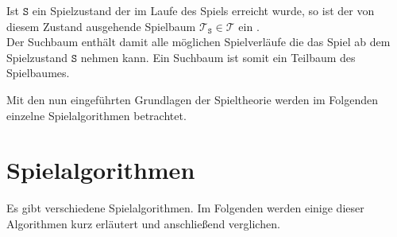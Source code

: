 \begin{Definition}
Ist $\mathtt{S}$ ein Spielzustand der im Laufe des Spiels erreicht wurde, so ist der von diesem Zustand ausgehende Spielbaum $\mathcal{T}_{\mathtt{S}} \in \mathcal{T}$ ein .
\\Der Suchbaum enthält damit alle möglichen Spielverläufe die das Spiel ab dem Spielzustand $\mathtt{S}$ nehmen kann. Ein Suchbaum ist somit ein Teilbaum des Spielbaumes.  
\end{Definition}
Mit den nun eingeführten Grundlagen der Spieltheorie werden im Folgenden einzelne Spielalgorithmen betrachtet. 
\newpage
\section{Spielalgorithmen}
Es gibt verschiedene Spielalgorithmen. Im Folgenden werden einige dieser Algorithmen kurz erläutert und anschließend verglichen.
